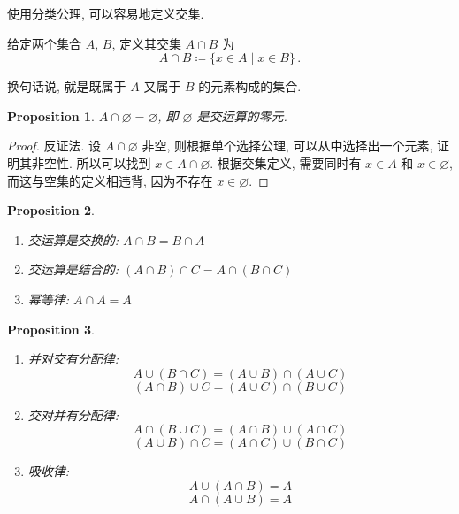 \documentclass[UTF8]{ctexart}
\theoremstyle{mystyle}
\newtheorem{proposition}{Proposition}[section]
\theoremstyle{myremark}
\theoremstyle{plain}
\begin{document}
使用分类公理, 可以容易地定义交集.

\begin{definition}[\text{交}]
    给定两个集合 $ A $, $ B $, 定义其交集 $ A \cap B $ 为
    \[ A \cap B \coloneqq \{x \in A \mid x \in B\} \,.\]

    换句话说, 就是既属于 $ A $ 又属于 $ B $ 的元素构成的集合.
\end{definition}

\begin{proposition}
    $ A \cap \varnothing = \varnothing $, 即 $ \varnothing $ 是交运算的零元.
\end{proposition}

\begin{proof}
    反证法. 设 $ A \cap \varnothing $ 非空, 则根据单个选择公理, 可以从中选择出一个元素, 证明其非空性. 所以可以找到 $ x \in A \cap \varnothing $. 根据交集定义, 需要同时有 $ x \in A $ 和 $ x \in \varnothing $, 而这与空集的定义相违背, 因为不存在 $ x \in \varnothing $.
\end{proof}

\begin{proposition} \ 
    \begin{enumerate}
        \item 交运算是交换的: $ A \cap B = B \cap A $
        \item 交运算是结合的: $ (A \cap B) \cap C = A \cap (B \cap C) $
        \item 幂等律: $ A \cap A = A $
    \end{enumerate}
\end{proposition}

\begin{proposition} \ 
    \begin{enumerate}
        \item 并对交有分配律: \[ A \cup (B \cap C) = (A \cup B) \cap (A \cup C) \] \[ (A \cap B) \cup C = (A \cup C) \cap (B \cup C) \]
        \item 交对并有分配律: \[ A \cap (B \cup C) = (A \cap B) \cup (A \cap C) \] \[ (A \cup B) \cap C = (A \cap C) \cup (B \cap C) \]
        \item 吸收律: \[ A \cup (A \cap B) = A \] \[ A \cap (A \cup B) = A \]
    \end{enumerate}
\end{proposition}
\end{document}
